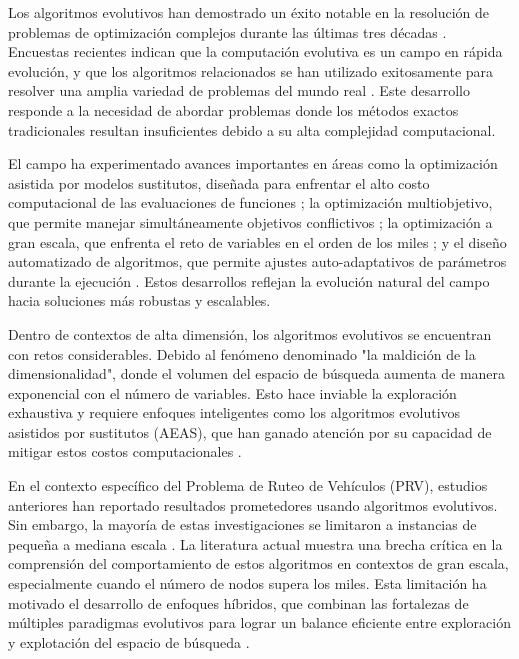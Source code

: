 \documentclass[conference]{IEEEtran}
\begin{document}
Los algoritmos evolutivos han demostrado un éxito notable en la resolución de problemas de optimización complejos durante las últimas tres décadas \cite{fogel2006,back2013}. Encuestas recientes indican que la computación evolutiva es un campo en rápida evolución, y que los algoritmos relacionados se han utilizado exitosamente para resolver una amplia variedad de problemas del mundo real \cite{yang2013}. Este desarrollo responde a la necesidad de abordar problemas donde los métodos exactos tradicionales resultan insuficientes debido a su alta complejidad computacional.

El campo ha experimentado avances importantes en áreas como la optimización asistida por modelos sustitutos, diseñada para enfrentar el alto costo computacional de las evaluaciones de funciones \cite{jin2011}; la optimización multiobjetivo, que permite manejar simultáneamente objetivos conflictivos \cite{coello2007,zhang2008}; la optimización a gran escala, que enfrenta el reto de variables en el orden de los miles \cite{lozano2011}; y el diseño automatizado de algoritmos, que permite ajustes auto-adaptativos de parámetros durante la ejecución \cite{brest2006}. Estos desarrollos reflejan la evolución natural del campo hacia soluciones más robustas y escalables.

Dentro de contextos de alta dimensión, los algoritmos evolutivos se encuentran con retos considerables.
Debido al fenómeno denominado "la maldición de la dimensionalidad", donde el volumen del espacio de búsqueda aumenta de manera exponencial con el número de variables. Esto hace inviable la exploración exhaustiva y requiere enfoques inteligentes como los algoritmos evolutivos asistidos por sustitutos (AEAS), que han ganado atención por su capacidad de mitigar estos costos computacionales \cite{wang2018}.

En el contexto específico del Problema de Ruteo de Vehículos (PRV), estudios anteriores han reportado resultados prometedores usando algoritmos evolutivos. Sin embargo, la mayoría de estas investigaciones se limitaron a instancias de pequeña a mediana escala \cite{rego2011}. La literatura actual muestra una brecha crítica en la comprensión del comportamiento de estos algoritmos en contextos de gran escala, especialmente cuando el número de nodos supera los miles. Esta limitación ha motivado el desarrollo de enfoques híbridos, que combinan las fortalezas de múltiples paradigmas evolutivos para lograr un balance eficiente entre exploración y explotación del espacio de búsqueda \cite{potter2000}.
\end{document}
